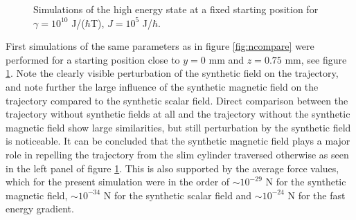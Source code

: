 \documentclass[main.tex]{subfiles}
\begin{document}
\begin{figure}[h]
    \centering
    \qquad
    \qquad
    \caption{\centering Simulations of the high energy state at a fixed starting position for \(\gamma
    = 10^{10}\) J/(\(\hbar{}\)T), \(J= 10^{5}\) J/\(\hbar{}\).}%
    \label{fig:n2m-25}
\end{figure}

First simulations of the same parameters as in figure \ref{fig:ncompare} were performed for
a starting position close to \(y=0\) mm and \(z = 0.75\) mm, see figure
\ref{fig:n2m-25}. Note the clearly visible perturbation of the synthetic field on the trajectory,
and note further the large influence of the synthetic magnetic field on the trajectory
compared to the synthetic scalar field. Direct comparison between the trajectory without
synthetic fields at all and the trajectory without the synthetic magnetic field show large
similarities, but still perturbation by the synthetic field is noticeable. It can be
concluded that the synthetic magnetic field plays a major role in repelling the trajectory
from the slim cylinder traversed otherwise as seen in the left panel of figure \ref{fig:n2m-25}. This is also
supported by the average force values, which for the present simulation were in the order
of \(\sim 10^{-29}\) N for the synthetic magnetic field, \(\sim 10^{-34}\) N for the synthetic
scalar field and \(\sim 10^{-24}\) N for the fast energy gradient.
\end{document}
